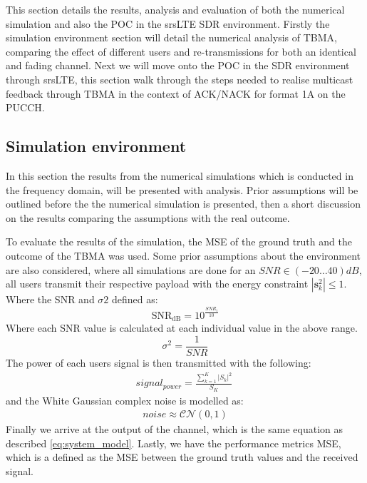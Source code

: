 \documentclass{article}
\begin{document}
This section details the results, analysis and evaluation of both the numerical simulation and also the \ac{POC} in the srsLTE SDR environment. Firstly the simulation environment section will detail the numerical analysis of TBMA, comparing the effect of different users and re-transmissions for both an identical and fading channel. Next we will move onto the \ac{POC} in the SDR environment through srsLTE, this section walk through the steps needed to realise multicast feedback through TBMA in the context of ACK/NACK for format 1A on the PUCCH.  

\subsection{Simulation environment}
In this section the results from the numerical simulations which is conducted in the frequency domain, will be presented with analysis. Prior assumptions will be outlined before the the numerical simulation is presented, then a short discussion on the results comparing the assumptions with the real outcome. 

To evaluate the results of the simulation, the \ac{MSE} of the ground truth and the outcome of the TBMA was used. Some prior assumptions about the environment are also considered, where all simulations are done for an $SNR \in (-20\dots40)dB$, all users transmit their respective payload with the energy constraint  $|\textbf{s}_{k}^2| \leq 1$.  
Where the SNR and $\sigma2$ defined as:
\begin{equation} 
\text{SNR}_{\text{dB}} = 10^{\frac{SNR_{i}}{10}}    
\end{equation}
Where each SNR value is calculated at each individual value in the above range.
\begin{equation}
    \sigma^2 = \frac{1}{SNR}
\end{equation}
The power of each users signal is then transmitted with the following:
\begin{align}
    signal_{power} = \frac{\sum\limits_{k=1}^{K}|S_{k}|^2 }{S_{K}} \     
\end{align}
and the White Gaussian complex noise is modelled as:
\begin{align}
    noise \approx \mathcal{CN}(0,1)
\end{align}
Finally we arrive at the output of the channel, which is the same equation as described \cref{eq:system_model}. Lastly, we have the performance metrics MSE, which is a defined as the MSE between the ground truth values and the received signal.
\end{document}
